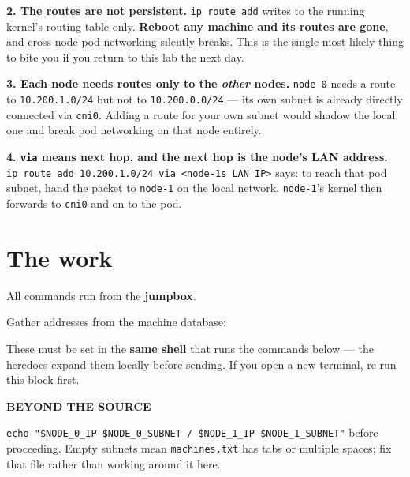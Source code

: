 \documentclass[11pt,oneside]{report}
\newcommand{\calloutlabel}[2]{{\sffamily\bfseries\footnotesize\color{#1}#2\quad}}
\begin{document}
\textbf{2. The
routes are not
persistent.}
\texttt{ip\ route\ add}
writes to the
running kernel's
routing table only.
\textbf{Reboot any
machine and its
routes are gone},
and cross-node pod
networking silently
breaks. This is the
single most likely
thing to bite you if
you return to this
lab the next day.

\textbf{3. Each node
needs routes only to
the \emph{other}
nodes.}
\texttt{node-0}
needs a route to
\texttt{10.200.1.0/24}
but not to
\texttt{10.200.0.0/24}
--- its own subnet
is already directly
connected via
\texttt{cni0}.
Adding a route for
your own subnet
would shadow the
local one and break
pod networking on
that node entirely.

\textbf{4.
\texttt{via} means
next hop, and the
next hop is the
node's LAN address.}
\texttt{ip\ route\ add\ 10.}\allowbreak{}\texttt{200.}\allowbreak{}\texttt{1.}\allowbreak{}\texttt{0/}\allowbreak{}\texttt{24\ via\ \textless{}node-}\allowbreak{}\texttt{1\textquotesingle{}s\ LAN\ IP\textgreater{}}
says: to reach that
pod subnet, hand the
packet to
\texttt{node-1} on
the local network.
\texttt{node-1}'s
kernel then forwards
to \texttt{cni0} and
on to the pod.

\hypertarget{the-work-10}{%
\section{The
work}\label{the-work-10}}

All commands run
from the
\textbf{jumpbox}.

Gather addresses
from the machine
database:


These must be set in
the \textbf{same
shell} that runs the
commands below ---
the heredocs expand
them locally before
sending. If you open
a new terminal,
re-run this block
first.

\begin{beyondbox}\calloutlabel{teal}{BEYOND THE SOURCE}

\texttt{echo\ "\$NODE\_0\_IP\ \$NODE\_0\_SUBNET\ /}\allowbreak{}\texttt{\ \$NODE\_1\_IP\ \$NODE\_1\_SUBNET"}
before proceeding.
Empty subnets mean
\texttt{machines.txt}
has tabs or multiple
spaces; fix that
file rather than
working around it
here.

\end{beyondbox}
\end{document}
